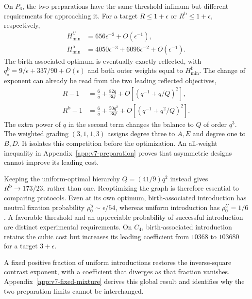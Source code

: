 \documentclass[aps,pre,reprint,amsmath,amssymb,longbibliography]{revtex4-2}
\begin{document}
On $P_6$, the two preparations have the same threshold infimum but
different requirements for approaching it. For a target $R\le1+\epsilon$
or $R^{\mathrm b}\le1+\epsilon$, respectively,
\begin{equation}
 \begin{aligned}
 H_{\min}^{U}&=656\epsilon^{-2}+O(\epsilon^{-1}),\\
 H_{\min}^{\mathrm b}
 &=4050\epsilon^{-3}+6096\epsilon^{-2}+O(\epsilon^{-1}).
 \end{aligned}
 \label{eq:v7-preparation-costs}
\end{equation}
The birth-associated optimum is eventually exactly reflected, with
$q_\star^{\mathrm b}=9/\epsilon+337/90+O(\epsilon)$ and both outer
weights equal to $H_{\min}^{\mathrm b}$. The change of exponent can
already be read from the two leading reflected objectives,
\begin{equation}
 \begin{aligned}
 R-1&=\frac6q+\frac{82q}{3Q}
       +O\!\left[(q^{-1}+q/Q)^2\right],\\
 R^{\mathrm b}-1&=\frac6q+\frac{50q^2}{3Q}
       +O\!\left[(q^{-1}+q^2/Q)^2\right].
 \end{aligned}
 \label{eq:v7-preparation-objectives}
\end{equation}
The extra power of $q$ in the second term changes the balance to
$Q$ of order $q^3$. The weighted grading $(3,1,1,3)$ assigns degree three to $A,E$ and
degree one to $B,D$. It isolates this competition
before the optimization. An all-weight inequality in
Appendix~\ref{app:v7-preparation} proves that asymmetric designs cannot
improve its leading cost.

Keeping the uniform-optimal hierarchy $Q=(41/9)q^2$ instead gives
$R^{\mathrm b}\to173/23$, rather than one. Reoptimizing the graph is
therefore essential to comparing protocols. Even at its own optimum,
birth-associated introduction has neutral fixation probability
$\rho_0^{\mathrm b}\sim\epsilon/54$, whereas uniform introduction
has $\rho_0^U=1/6$. A favorable threshold and an appreciable probability
of successful introduction are distinct experimental requirements.
On $C_4$, birth-associated introduction retains the cubic cost but
increases its leading coefficient from $10368$ to $103680$ for a
target $3+\epsilon$.

A fixed positive fraction of uniform introductions restores the inverse-square
contrast exponent, with a coefficient that diverges as that fraction
vanishes. Appendix~\ref{app:v7-fixed-mixture} derives this global result
and identifies why the two preparation limits cannot be interchanged.
\end{document}
